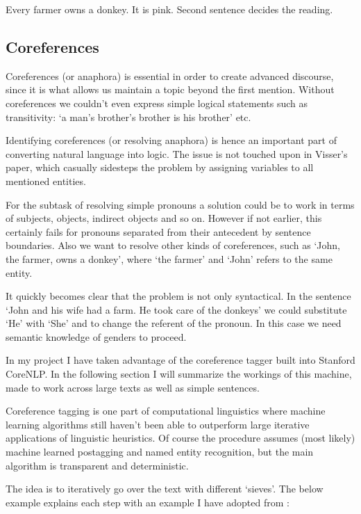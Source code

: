 \documentclass[12pt]{article}
\begin{document}
Every farmer owns a donkey. It is pink. Second sentence decides the reading.

\subsection{Coreferences}\label{sec:coreferences}
Coreferences (or anaphora) is essential in order to create advanced discourse, since it is what allows us maintain a topic beyond the first mention. Without coreferences we couldn't even express simple logical statements such as transitivity: `a man's brother's brother is his brother' etc.

Identifying coreferences (or resolving anaphora) is hence an important part of converting natural language into logic. The issue is not touched upon in Visser's paper, which casually sidesteps the problem by assigning variables to all mentioned entities.

For the subtask of resolving simple pronouns a solution could be to work in terms of subjects, objects, indirect objects and so on. However if not earlier, this certainly fails for pronouns separated from their antecedent by sentence boundaries. Also we want to resolve other kinds of coreferences, such as `John, the farmer, owns a donkey', where `the farmer' and `John' refers to the same entity.

It quickly becomes clear that the problem is not only syntactical. In the sentence `John and his wife had a farm. He took care of the donkeys' we could substitute `He' with `She' and to change the referent of the pronoun. In this case we need semantic knowledge of genders to proceed.

In my project I have taken advantage of the coreference tagger built into Stanford CoreNLP\cite{lee2013deterministic}\cite{lee2011stanford}\cite{raghunathan2010multi}. In the following section I will summarize the workings of this machine, made to work across large texts as well as simple sentences.

Coreference tagging is one part of computational linguistics where machine learning algorithms still haven't been able to outperform large iterative applications of linguistic heuristics. Of course the procedure assumes (most likely) machine learned postagging and named entity recognition, but the main algorithm is transparent and deterministic.

The idea is to iteratively go over the text with different `sieves'. The below example explains each step with an example I have adopted from \cite{lee2013deterministic}:
\end{document}
